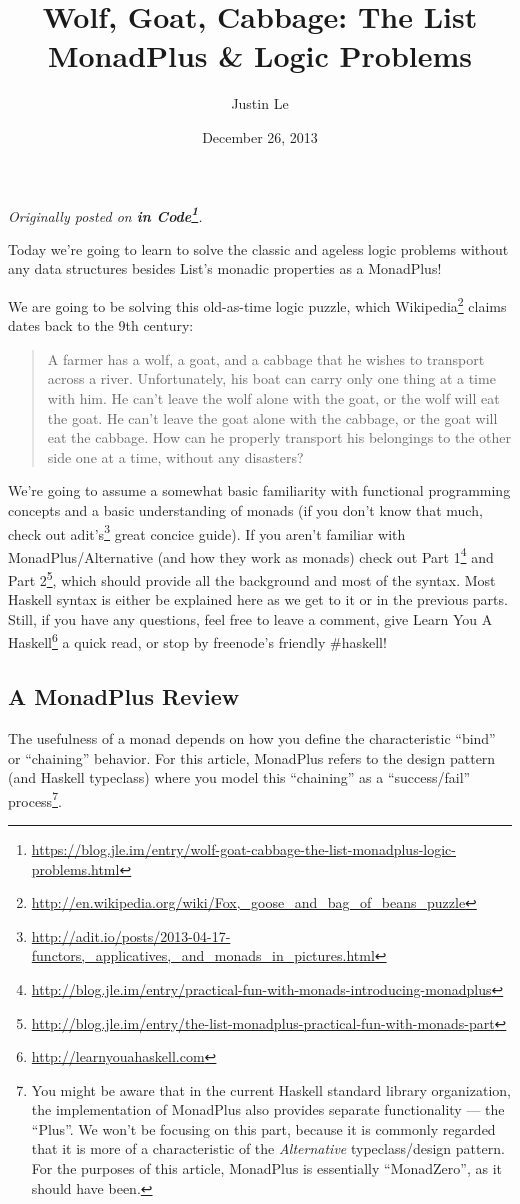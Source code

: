 \documentclass[]{article}
\title{Wolf, Goat, Cabbage: The List MonadPlus \& Logic Problems}
\author{Justin Le}
\date{December 26, 2013}
\renewcommand{\href}[2]{#2\footnote{\url{#1}}}
\begin{document}
\maketitle

\emph{Originally posted on
\textbf{\href{https://blog.jle.im/entry/wolf-goat-cabbage-the-list-monadplus-logic-problems.html}{in
Code}}.}

Today we're going to learn to solve the classic and ageless logic problems
without any data structures besides List's monadic properties as a MonadPlus!

We are going to be solving this old-as-time logic puzzle, which
\href{http://en.wikipedia.org/wiki/Fox,_goose_and_bag_of_beans_puzzle}{Wikipedia}
claims dates back to the 9th century:

\begin{quote}
A farmer has a wolf, a goat, and a cabbage that he wishes to transport across a
river. Unfortunately, his boat can carry only one thing at a time with him. He
can't leave the wolf alone with the goat, or the wolf will eat the goat. He
can't leave the goat alone with the cabbage, or the goat will eat the cabbage.
How can he properly transport his belongings to the other side one at a time,
without any disasters?
\end{quote}

We're going to assume a somewhat basic familiarity with functional programming
concepts and a basic understanding of monads (if you don't know that much, check
out
\href{http://adit.io/posts/2013-04-17-functors,_applicatives,_and_monads_in_pictures.html}{adit's}
great concice guide). If you aren't familiar with MonadPlus/Alternative (and how
they work as monads) check out
\href{http://blog.jle.im/entry/practical-fun-with-monads-introducing-monadplus}{Part
1} and
\href{http://blog.jle.im/entry/the-list-monadplus-practical-fun-with-monads-part}{Part
2}, which should provide all the background and most of the syntax. Most Haskell
syntax is either be explained here as we get to it or in the previous parts.
Still, if you have any questions, feel free to leave a comment, give
\href{http://learnyouahaskell.com}{Learn You A Haskell} a quick read, or stop by
freenode's friendly \#haskell!

\subsection{A MonadPlus Review}\label{a-monadplus-review}

The usefulness of a monad depends on how you define the characteristic ``bind''
or ``chaining'' behavior. For this article, MonadPlus refers to the design
pattern (and Haskell typeclass) where you model this ``chaining'' as a
``success/fail'' process\footnote{You might be aware that in the current Haskell
  standard library organization, the implementation of MonadPlus also provides
  separate functionality --- the ``Plus''. We won't be focusing on this part,
  because it is commonly regarded that it is more of a characteristic of the
  \emph{Alternative} typeclass/design pattern. For the purposes of this article,
  MonadPlus is essentially ``MonadZero'', as it should have been.}.
\end{document}
